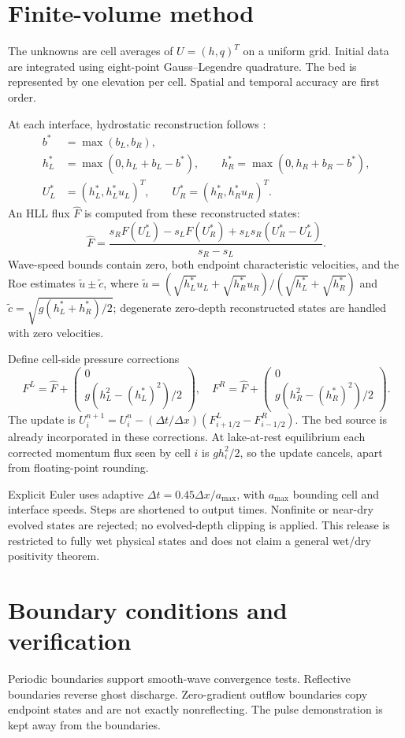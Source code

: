 \documentclass[11pt]{article}
\begin{document}
\section{Finite-volume method}
The unknowns are cell averages of $U=(h,q)^T$ on a uniform grid. Initial data are integrated using eight-point Gauss--Legendre quadrature. The bed is represented by one elevation per cell. Spatial and temporal accuracy are first order.

At each interface, hydrostatic reconstruction follows \cite{Audusse2004}:
\begin{align}
b^*&=\max(b_L,b_R),\\
h_L^*&=\max(0,h_L+b_L-b^*),\qquad
h_R^*=\max(0,h_R+b_R-b^*),\\
U_L^*&=(h_L^*,h_L^*u_L)^T,\qquad U_R^*=(h_R^*,h_R^*u_R)^T.
\end{align}
An HLL flux $\widehat F$ is computed from these reconstructed states:
\[
\widehat F=\frac{s_RF(U_L^*)-s_LF(U_R^*)+s_Ls_R(U_R^*-U_L^*)}{s_R-s_L}.
\]
Wave-speed bounds contain zero, both endpoint characteristic velocities, and the Roe estimates $\widetilde u\pm\widetilde c$, where $\widetilde u=(\sqrt{h_L^*}u_L+\sqrt{h_R^*}u_R)/(\sqrt{h_L^*}+\sqrt{h_R^*})$ and $\widetilde c=\sqrt{g(h_L^*+h_R^*)/2}$; degenerate zero-depth reconstructed states are handled with zero velocities.

Define cell-side pressure corrections
\[
F^L=\widehat F+\begin{pmatrix}0\\g(h_L^2-(h_L^*)^2)/2\end{pmatrix},\quad
F^R=\widehat F+\begin{pmatrix}0\\g(h_R^2-(h_R^*)^2)/2\end{pmatrix}.
\]
The update is $U_i^{n+1}=U_i^n-(\Delta t/\Delta x)(F^L_{i+1/2}-F^R_{i-1/2})$. The bed source is already incorporated in these corrections. At lake-at-rest equilibrium each corrected momentum flux seen by cell $i$ is $gh_i^2/2$, so the update cancels, apart from floating-point rounding.

Explicit Euler uses adaptive $\Delta t=0.45\Delta x/a_{\max}$, with $a_{\max}$ bounding cell and interface speeds. Steps are shortened to output times. Nonfinite or near-dry evolved states are rejected; no evolved-depth clipping is applied. This release is restricted to fully wet physical states and does not claim a general wet/dry positivity theorem.

\section{Boundary conditions and verification}
Periodic boundaries support smooth-wave convergence tests. Reflective boundaries reverse ghost discharge. Zero-gradient outflow boundaries copy endpoint states and are not exactly nonreflecting. The pulse demonstration is kept away from the boundaries.
\end{document}
